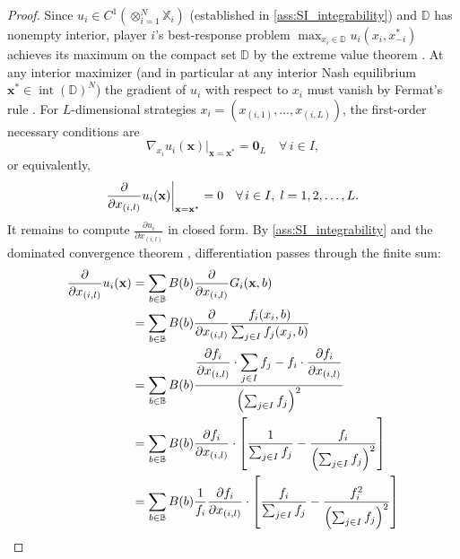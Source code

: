 \documentclass{article}
\begin{document}
            \begin{proof}
                Since $u_i \in C^1(\otimes_{i=1}^N \mathbb{X}_i)$ (established in \ref{ass:SI_integrability}) and $\mathbb{D}$ has nonempty interior, player $i$'s best-response problem $\max_{x_i \in \mathbb{D}} u_i(x_i, x_{-i}^*)$ achieves its maximum on the compact set $\mathbb{D}$ by the extreme value theorem \cite[Thm.~4.16]{rudin1976principles}. At any interior maximizer (and in particular at any interior Nash equilibrium $\mathbf{x}^*\in\operatorname{int}(\mathbb{D})^N$) the gradient of $u_i$ with respect to $x_i$ must vanish by Fermat's rule \cite[Thm.~27.1]{rockafellar1970convex}. For $L$-dimensional strategies $x_i = (x_{(i,1)},\ldots,x_{(i,L)})$, the first-order necessary conditions are
                \begin{equation}
                    \nabla_{x_i}u_i(\mathbf{x})\big|_{\mathbf{x}=\mathbf{x}^*} = \mathbf{0}_L
                    \quad \forall\, i \in I, \label{eq:SI_first_order_cond}
                \end{equation}
                or equivalently,
                \begin{equation}
                    \pdv{}{x_{(i,l)}}u_i(\mathbf{x})\bigg|_{\mathbf{x}=\mathbf{x}^*}=0
                    \quad \forall\, i\in I,\; l=1,2,\dots,L.
                \end{equation}
                It remains to compute $\frac{\partial u_i}{\partial x_{(i,l)}}$ in closed form. By \ref{ass:SI_integrability} and the dominated convergence theorem \cite[Thm.~1.34]{rudin1987real}, differentiation passes through the finite sum:
                \begin{align}
                    \pdv{}{x_{(i,l)}}u_i(\mathbf{x})
                    &=\sum_{b\in \mathbb{B}} B(b)\pdv{}{x_{(i,l)}}G_i(\mathbf{x},b) \\ %
                    &=\sum_{b\in \mathbb{B}} B(b)\pdv{}{x_{(i,l)}}\frac{f_{i}(x_i,b)}{\sum_{j\in I}f_{j}(x_j,b)} \\ %
                    &=\sum_{b\in \mathbb{B}} B(b)\frac{\displaystyle\pdv{f_i}{x_{(i,l)}}\cdot\sum_{j\in I} f_{j} - f_{i}\cdot\pdv{f_i}{x_{(i,l)}}}{\left(\sum_{j\in I} f_{j}\right)^2}
                    \label{eq:SI_quotient_rule}\\ %
                    &=\sum_{b\in \mathbb{B}} B(b) \pdv{f_i}{x_{(i,l)}} \cdot \left[\frac{1}{\sum_{j\in I} f_{j}}- \frac{f_{i}}{\left(\sum_{j\in I} f_{j}\right)^2}\right] \\ %
                    &=\sum_{b\in \mathbb{B}} B(b) \frac{1}{f_i}\pdv{f_i}{x_{(i,l)}} \cdot \left[\frac{f_{i}}{\sum_{j\in I} f_{j}}- \frac{f_{i}^2}{\left(\sum_{j\in I} f_{j}\right)^2}\right] \\ %

\end{align}
\end{proof}
\end{document}
